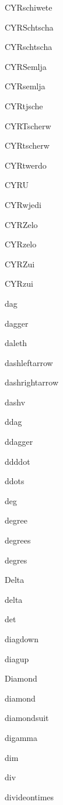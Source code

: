 \documentclass{article}
\begin{document}
CYRschiwete    \CYRschiwete{}

CYRSchtscha    \CYRSchtscha{}

CYRschtscha    \CYRschtscha{}

CYRSemlja    \CYRSemlja{}

CYRsemlja    \CYRsemlja{}

CYRtjsche    \CYRtjsche{}

CYRTscherw    \CYRTscherw{}

CYRtscherw    \CYRtscherw{}

CYRtwerdo    \CYRtwerdo{}

CYRU    \CYRU{}

CYRwjedi    \CYRwjedi{}

CYRZelo    \CYRZelo{}

CYRzelo    \CYRzelo{}

CYRZui    \CYRZui{}

CYRzui    \CYRzui{}


dag    \dag{}

dagger    \dagger{}

daleth    \daleth{}

dashleftarrow    \dashleftarrow{}

dashrightarrow    \dashrightarrow{}

dashv    \dashv{}

ddag    \ddag{}

ddagger    \ddagger{}

ddddot    \ddddot{}

ddots    \ddots{}

deg    \deg{}

degree    \degree{}

degrees    \degrees{}

degres    \degres{}

Delta    \Delta{}

delta    \delta{}

det    \det{}

diagdown    \diagdown{}

diagup    \diagup{}

Diamond    \Diamond{}

diamond    \diamond{}

diamondsuit    \diamondsuit{}

digamma    \digamma{}

dim    \dim{}

div    \div{}

divideontimes    \divideontimes{}
\end{document}
